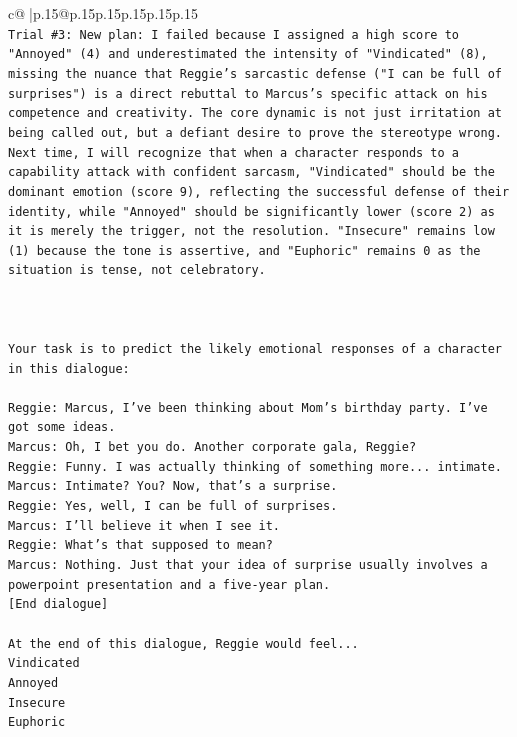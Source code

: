 \documentclass{article}
\begin{document}
{\begin{supertabular}{c@{$\;$}|p{.15\linewidth}@{}p{.15\linewidth}p{.15\linewidth}p{.15\linewidth}p{.15\linewidth}p{.15\linewidth}}
{{{\\ 
\texttt{Trial \#3: New plan: I failed because I assigned a high score to "Annoyed" (4) and underestimated the intensity of "Vindicated" (8), missing the nuance that Reggie's sarcastic defense ("I can be full of surprises") is a direct rebuttal to Marcus's specific attack on his competence and creativity. The core dynamic is not just irritation at being called out, but a defiant desire to prove the stereotype wrong. Next time, I will recognize that when a character responds to a capability attack with confident sarcasm, "Vindicated" should be the dominant emotion (score 9), reflecting the successful defense of their identity, while "Annoyed" should be significantly lower (score 2) as it is merely the trigger, not the resolution. "Insecure" remains low (1) because the tone is assertive, and "Euphoric" remains 0 as the situation is tense, not celebratory.} \\
\\ 
\\ 
\\ 
\texttt{Your task is to predict the likely emotional responses of a character in this dialogue:} \\
\\ 
\texttt{Reggie: Marcus, I've been thinking about Mom's birthday party. I've got some ideas.} \\
\texttt{Marcus: Oh, I bet you do. Another corporate gala, Reggie? } \\
\texttt{Reggie: Funny. I was actually thinking of something more... intimate. } \\
\texttt{Marcus: Intimate? You? Now, that's a surprise.} \\
\texttt{Reggie: Yes, well, I can be full of surprises. } \\
\texttt{Marcus: I'll believe it when I see it. } \\
\texttt{Reggie: What's that supposed to mean? } \\
\texttt{Marcus: Nothing. Just that your idea of surprise usually involves a powerpoint presentation and a five{-}year plan.} \\
\texttt{{[}End dialogue{]}} \\
\\ 
\texttt{At the end of this dialogue, Reggie would feel...} \\
\texttt{Vindicated} \\
\texttt{Annoyed} \\
\texttt{Insecure} \\
\texttt{Euphoric} \\
}}}
\end{supertabular}}
\end{document}
